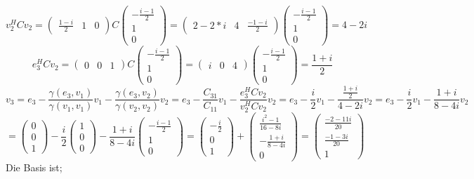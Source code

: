 \documentclass{article} %
\begin{document}
\[
v_2^H C v_2 = \left(\begin{matrix}
\frac{1-i}{2} & 1 & 0
\end{matrix}\right) C \begin{pmatrix}
-\frac{i-1}{2}\\1\\0
\end{pmatrix}  = \left(\begin{matrix}
2-2*i & 4 & \frac{-1-i}{2}
\end{matrix}\right) \begin{pmatrix}
-\frac{i-1}{2}\\1\\0
\end{pmatrix} = 4-2i
\]
\[
e_3^H C v_2 = \left(\begin{matrix}
0&0&1
\end{matrix}\right) C \begin{pmatrix}
-\frac{i-1}{2}\\1\\0
\end{pmatrix}  = \left(\begin{matrix}
i & 0 & 4
\end{matrix}\right) \begin{pmatrix}
-\frac{i-1}{2}\\1\\0
\end{pmatrix} = \frac{1+i}{2}
\]
\[
v_3 = e_3 - \frac{\gamma(e_3, v_1)}{\gamma(v_1, v_1)} v_1 - \frac{\gamma(e_3, v_2)}{\gamma(v_2, v_2)} v_2 = e_3 - \frac{C_{31}}{C_{11}} v_1 - \frac{e_3^H C v_2}{v_2^H C v_2}v_2  = e_3 - \frac{i}{2} v_1 - \frac{\frac{1+i}{2}}{4-2i} v_2 = e_3 - \frac{i}{2} v_1 - \frac{{1+i}}{8-4i} v_2
\]
\[
 = \begin{pmatrix}
0\\0\\1
\end{pmatrix} - \frac{i}{2} \begin{pmatrix}
1\\0\\0
\end{pmatrix} - \frac{{1+i}}{8-4i}  \begin{pmatrix}
-\frac{i-1}{2}\\1\\0
\end{pmatrix} = \begin{pmatrix}
- \frac{i}{2}\\0\\1
\end{pmatrix} 
+ \begin{pmatrix}
\frac{i^2-1}{16-8i}\\- \frac{{1+i}}{8-4i} \\0
\end{pmatrix} = \left(\begin{matrix}
\frac{-2-11i}{20} \\
\frac{-1-3i}{20} \\
1
\end{matrix}\right)
\]
Die Basis ist; 
\end{document}
